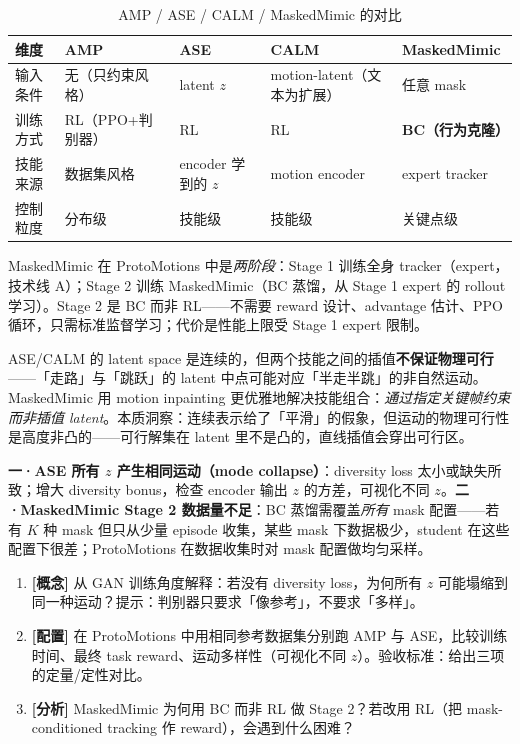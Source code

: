 \begin{table}[ht]
\centering
\small
\caption{AMP / ASE / CALM / MaskedMimic 的对比}
\label{tab:rlmc-imit-ase-compare}
\begin{tabular}{@{}lllll@{}}
\toprule
维度 & AMP & ASE & CALM & MaskedMimic \\
\midrule
输入条件 & 无（只约束风格） & latent $z$ & motion-latent（文本为扩展） & 任意 mask \\
训练方式 & RL（PPO+判别器） & RL & RL & \textbf{BC（行为克隆）} \\
技能来源 & 数据集风格 & encoder 学到的 $z$ & motion encoder & expert tracker \\
控制粒度 & 分布级 & 技能级 & 技能级 & 关键点级 \\
\bottomrule
\end{tabular}
\end{table}

MaskedMimic 在 ProtoMotions 中是\emph{两阶段}：Stage 1 训练全身 tracker（expert，技术线 A）；Stage 2 训练 MaskedMimic（BC 蒸馏，从 Stage 1 expert 的 rollout 学习）。Stage 2 是 BC 而非 RL——不需要 reward 设计、advantage 估计、PPO 循环，只需标准监督学习；代价是性能上限受 Stage 1 expert 限制。

\begin{insight}\label{ins:rlmc-imit-latent}
ASE/CALM 的 latent space 是连续的，但两个技能之间的插值\textbf{不保证物理可行}——「走路」与「跳跃」的 latent 中点可能对应「半走半跳」的非自然运动。MaskedMimic 用 motion inpainting 更优雅地解决技能组合：\emph{通过指定关键帧约束而非插值 latent}。本质洞察：连续表示给了「平滑」的假象，但运动的物理可行性是高度非凸的——可行解集在 latent 里不是凸的，直线插值会穿出可行区。
\end{insight}

\begin{pitfall}
\textbf{一·ASE 所有 $z$ 产生相同运动（mode collapse）}：diversity loss 太小或缺失所致；增大 diversity bonus，检查 encoder 输出 $z$ 的方差，可视化不同 $z$。\textbf{二·MaskedMimic Stage 2 数据量不足}：BC 蒸馏需覆盖\emph{所有} mask 配置——若有 $K$ 种 mask 但只从少量 episode 收集，某些 mask 下数据极少，student 在这些配置下很差；ProtoMotions 在数据收集时对 mask 配置做均匀采样。
\end{pitfall}

\begin{practice}
\begin{enumerate}
  \item \textbf{[概念]} 从 GAN 训练角度解释：若没有 diversity loss，为何所有 $z$ 可能塌缩到同一种运动？提示：判别器只要求「像参考」，不要求「多样」。
  \item \textbf{[配置]} 在 ProtoMotions 中用相同参考数据集分别跑 AMP 与 ASE，比较训练时间、最终 task reward、运动多样性（可视化不同 $z$）。验收标准：给出三项的定量/定性对比。
  \item \textbf{[分析]} MaskedMimic 为何用 BC 而非 RL 做 Stage 2？若改用 RL（把 mask-conditioned tracking 作 reward），会遇到什么困难？
\end{enumerate}
\end{practice}

